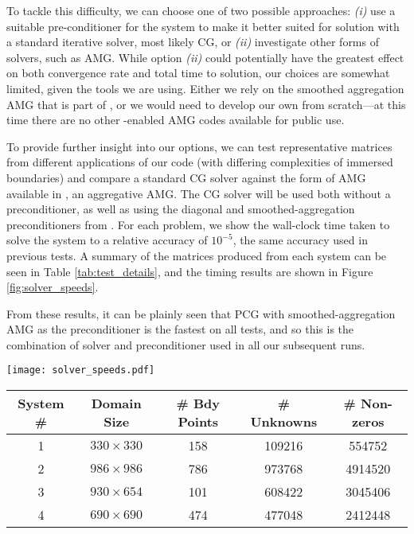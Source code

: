 To tackle this difficulty, we can choose one of two possible approaches: \emph{(i)} use a suitable pre-conditioner for the system to make it better suited for solution with a standard iterative solver, most likely CG, or \emph{(ii)} investigate other forms of solvers, such as AMG.
While option \emph{(ii)} could potentially have the greatest effect on both convergence rate and total time to solution, our choices are somewhat limited, given the tools we are using. Either we rely on the smoothed aggregation AMG that is part of {\cusp}, or we would need to develop our own from scratch---at this time there are no other \gpu-enabled AMG codes available for public use. 

To provide further insight into our options, we can test representative matrices from different applications of our code (with differing complexities of immersed boundaries) and compare a standard CG solver against the form of AMG available in {\cusp}, an aggregative AMG. The CG solver will be used both without a preconditioner, as well as using the diagonal and smoothed-aggregation preconditioners from {\cusp}. For each problem, we show the wall-clock time taken to solve the system to a relative accuracy of $10^{-5}$, the same accuracy used in previous tests. A summary of the matrices produced from each system can be seen in Table \ref{tab:test_details}, and the timing results are shown in Figure \ref{fig:solver_speeds}.

From these results, it can be plainly seen that PCG with smoothed-aggregation AMG as the preconditioner is the fastest on all tests, and so this is the combination of solver and preconditioner used in all our subsequent runs.

\begin{figure*}\centering
	\texttt{[image: solver\_speeds.pdf]}
	\caption{\small Comparison of {\gpu} solvers on real test problems - Conjugate Gradient, Preconditioned Conjugate Gradient with diagonal and Smoothed Aggregation preconditioners, and a full solve using Smoothed Aggregation}
	\label{fig:solver_speeds}
\label{fig:solver_speeds}
\end{figure*}

\begin{table*}
\begin{center}
\small
	\begin{tabular}{| c | c | c | c | c | }
	\hline
		System \# & Domain Size & \# Bdy Points & \# Unknowns & \# Non-zeros \\
	\hline
		1 & $330\times330$ & 158 & 109216 & 554752 \\
		2 & $986\times986$ & 786 & 973768 & 4914520 \\
		3 & $930\times654$ & 101 & 608422 & 3045406 \\
		4 & $690\times690$ & 474 & 477048 & 2412448 \\
	\hline
	\end{tabular}
	\caption{\small Systems $1$ and $2$ correspond to flow over a cylinder at $Re = 40$ and $3000$ respectively, system $3$ is for a flapping-wing calculation, and system $4$ is from a synthetic test with $3$ moving cylinders.}
	\label{tab:test_details}
\end{center}
\end{table*}

